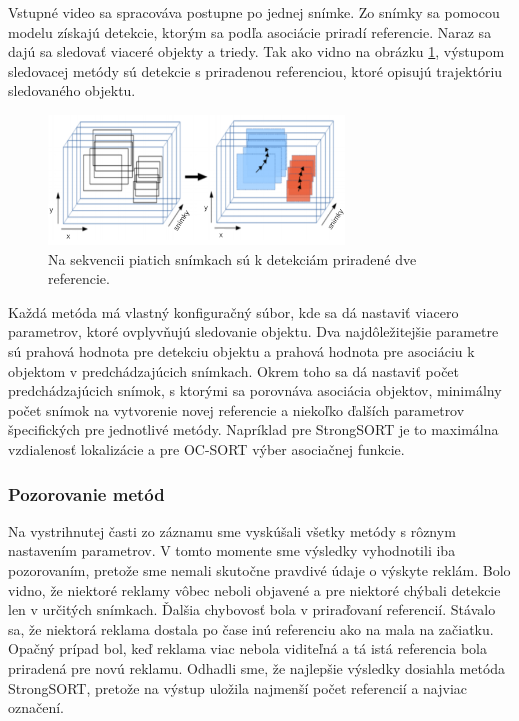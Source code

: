 Vstupné video sa spracováva postupne po jednej snímke. Zo snímky sa pomocou modelu získajú detekcie, ktorým sa podľa asociácie priradí referencie. Naraz sa dajú sa sledovať viaceré objekty a triedy. Tak ako vidno na obrázku \ref{img:tracking}, výstupom sledovacej metódy sú detekcie s priradenou referenciou, ktoré opisujú trajektóriu sledovaného objektu.

 \begin{figure}[ht]
     \centering
     \includegraphics[width=0.7\textwidth]{images/04/tracking.png}
     \caption{Na sekvencii piatich snímkach sú k detekciám priradené dve referencie.}
     \label{img:tracking}
 \end{figure}

Každá metóda má vlastný konfiguračný súbor, kde sa dá nastaviť viacero parametrov, ktoré ovplyvňujú sledovanie objektu. Dva najdôležitejšie parametre sú prahová hodnota pre detekciu objektu a prahová hodnota pre asociáciu k objektom v predchádzajúcich snímkach. Okrem toho sa dá nastaviť počet predchádzajúcich snímok, s ktorými sa porovnáva asociácia objektov, minimálny počet snímok na vytvorenie novej referencie a niekoľko ďalších parametrov špecifických pre jednotlivé metódy. Napríklad pre StrongSORT je to maximálna vzdialenosť lokalizácie a pre OC-SORT výber asociačnej funkcie.

\subsubsection{Pozorovanie metód}

Na vystrihnutej časti zo záznamu sme vyskúšali všetky metódy s rôznym nastavením parametrov. V tomto momente sme výsledky vyhodnotili iba pozorovaním, pretože sme nemali skutočne pravdivé údaje o výskyte reklám. Bolo vidno, že niektoré reklamy vôbec neboli objavené a pre niektoré chýbali detekcie len v určitých snímkach. Ďalšia chybovosť bola v priraďovaní referencií. Stávalo sa, že niektorá reklama dostala po čase inú referenciu ako na mala na začiatku. Opačný prípad bol, keď reklama viac nebola viditeľná a tá istá referencia bola priradená pre novú reklamu. Odhadli sme, že najlepšie výsledky dosiahla metóda StrongSORT, pretože na výstup uložila najmenší počet referencií a najviac označení.

